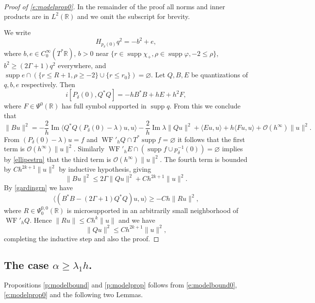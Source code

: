 \documentclass[reqno, 12pt]{amsart}
\newcommand \R {\mathbb{R}}
\newcommand \Oh {\mathcal{O}}
\newcommand \la {\langle}
\newcommand \ra {\rangle}
\DeclareMathOperator \im {Im}
\DeclareMathOperator \supp {supp}
\DeclareMathOperator \WF {WF}
\theoremstyle{definition}
\numberwithin{equation}{section}
\numberwithin{prop}{section}
\numberwithin{figure}{section}
\begin{document}
\begin{proof}[Proof of \eqref{e:modelprop0}]
In the remainder of the proof all norms and inner products are in $L^2(\R)$ and we omit the subscript for brevity.

We write
\[
H_{p_\delta(0)} q^2 = -b^2 + e,
\]
where $b,e \in C_0^\infty(T^*\R)$, $b > 0$ near $ \{ r \in \supp \chi_+, \rho \in \supp \varphi, -2 \le \rho\}$, $b^2 \ge (2\Gamma+1)q^2$ everywhere, and $\supp e \cap (\{ r  \le R+1, \rho \ge -2\} \cup \{r \le r_0\})= \varnothing$. Let $Q,B,E$ be quantizations of $q,b,e$ respectively. Then
\[
i[P_\delta(0),Q^*Q] = - hB^*B + hE + h^2F,
\]
where $F \in \Psi^0(\R)$ has full symbol supported in $\supp q$. From this we conclude that
\[
\|Bu\|^2 = - \frac2 h  \im \la Q^*Q(P_\delta(0) - \lambda)u,u\ra - \frac 2 h \im \lambda\|Q u\|^2+ \la E u, u \ra + h \la Fu,u\ra + \Oh(h^\infty)\|u\|^2.
\]
From $(P_\delta(0) - \lambda)u = f$ and $\WF'_h Q \cap T^*\supp f = \varnothing$ it follows that the first term is $\Oh(h^\infty)\|u\|^2$. Similarly $\WF'_h E \cap (\supp f\cup p_\delta^{-1}(0)) = \varnothing$ implies by \eqref{ellipestrn} that the third term is $\Oh(h^\infty)\|u\|^2$. The fourth term is bounded by $C h^{2k+1}\|u\|^2$ by inductive hypothesis, giving
\[
\|Bu\|^2 \le  2\Gamma \|Q u\|^2 + C h^{2k+1}\|u\|^2.
\]
By \eqref{gardingrn} we have
\[
\la(B^*B - (2\Gamma +1)Q^*Q)u,u\ra \ge -Ch\|Ru\|^2,
\]
where $R \in \Psi^{0,0}_0(\R)$ is microsupported in an arbitrarily small neighborhood of $\WF'_hQ$. Hence $\|Ru\| \le Ch^k \|u\|$ and we have
\[
\|Qu\|^2 \le  C h^{2k+1}\|u\|^2,
\]
completing the inductive step and also the proof.
\end{proof}

\subsection{The case $\alpha \ge \lambda_1h$.}

Propositions \ref{p:modelbound} and \ref{p:modelprop} follows from \eqref{e:modelbound0},  \eqref{e:modelprop0} and the following two Lemmas.
\end{document}
